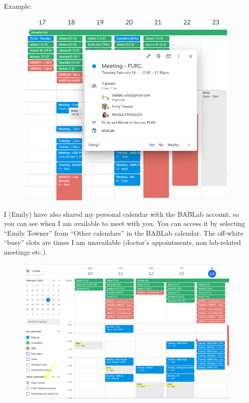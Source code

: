\documentclass[]{book}
\begin{document}
Example:

\begin{figure}
\centering
\includegraphics{images/lab_protocols/trainee_tuesdays_thursdays/1.png}
\caption{}
\end{figure}

I (Emily) have also shared my personal calendar with the BABLab account, so you can see when I am available to meet with you. You can access it by selecting ``Emily Towner'' from ``Other calendars'' in the BABLab calendar. The off-white ``busy'' slots are times I am unavailable (doctor's appointments, non lab-related meetings etc.).

\begin{figure}
\centering
\includegraphics{images/lab_protocols/trainee_tuesdays_thursdays/2.png}
\caption{}
\end{figure}
\end{document}
